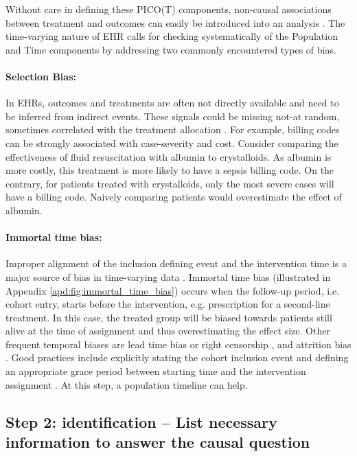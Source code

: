 \documentclass[10pt,letterpaper]{article}
\begin{document}
Without care in defining these PICO(T) components, non-causal associations
between treatment and outcomes can easily be introduced into an analysis \cite{catalogofbias}. The
time-varying nature of EHR calls for checking systematically of the Population
and Time components by addressing two commonly encountered types of bias.


\paragraph{Selection Bias:} In EHRs, outcomes and treatments are often not
directly available and need to be inferred from indirect events. These signals
could be missing not-at random, sometimes correlated with the treatment
allocation \cite{weiskopf2023healthcare}. For example, billing codes can be
strongly associated with case-severity and cost. Consider comparing the
effectiveness of fluid resuscitation with albumin to crystalloids. As albumin is
more costly, this treatment is more likely to have a sepsis billing code. On the
contrary, for patients treated with crystalloids, only the most severe cases
will have a billing code. Naively comparing patients would overestimate the
effect of albumin.

\paragraph{Immortal time bias:} Improper alignment of the inclusion defining
event and the intervention time is a major source of bias in time-varying data
\cite{suissa2008immortal,hernan2016specifying,wang2022understanding}. Immortal time bias (illustrated in
Appendix \ref{apd:fig:immortal_time_bias}) occurs when the follow-up period,
i.e. cohort entry, starts before the intervention, e.g. prescription for a
second-line treatment. In this case, the treated group will be biased towards
patients still alive at the time of assignment and thus overestimating the
effect size. Other frequent temporal biases are lead time bias
\cite{Oke2021leadtimebias,fu2021timing} or right censorship  \cite{hernan2016specifying}, and attrition bias
\cite{Bankhead2017attritionbias}. Good
practices include explicitly stating the cohort inclusion event   \cite[Chapter~10:Defining Cohorts]{ohdsi2019book} and defining
an appropriate grace period between starting time and the intervention
assignment \cite{hernan2016specifying}. At this step, a population timeline can
help.


\subsection*{Step 2: identification -- List necessary information to answer the causal question}\label{sec:identification}
\end{document}
